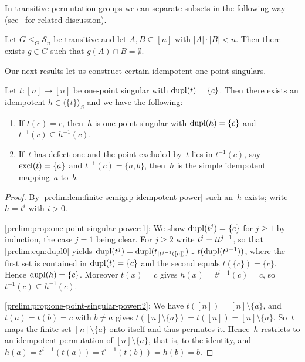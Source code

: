 In transitive permutation groups we can separate subsets in the following way
(see~\cite[p.~130]{ArCamSt2017} for related discussion).

\begin{theorem}
	\label{thm:separating_neumann}
	Let $G \le_G \mathcal S_n$ be transitive and let $A,B \subseteq [n]$ with $|A| \cdot |B| < n$.
	Then there exists $g \in G$ such that $g(A) \cap B = \emptyset$.
\end{theorem}

Our next results let us construct certain idempotent one-point singulars.

\begin{proposition} \label{prelim:prop:one-point-singular-power}
	Let $t \colon [n] \to [n]$ be one-point singular with $\dupl{t} = \{c\}$.
	Then there exists an idempotent $h \in \langle \{t\} \rangle_S$
	and we have the following:
	\begin{enumerate}
		\item \label{prelim:prop:one-point-singular-power:1} If $t(c) = c$, then~$h$ is one-point
		singular with $\dupl{h} = \{c\}$ and $t^{-1}(c) \subseteq h^{-1}(c)$.
		
		\item \label{prelim:prop:one-point-singular-power:2} If~$t$ has defect one and the point
		excluded by~$t$ lies in $t^{-1}(c)$, say $\excl{t} = \{a\}$ and $t^{-1}(c) = \{a,b\}$,
		then~$h$ is the simple idempotent mapping~$a$ to~$b$.
	\end{enumerate}
\end{proposition}
\begin{proof}
	By \cref{prelim:lem:finite-semigrp-idempotent-power} such an~$h$ exists; write $h = t^i$
	with $i > 0$.
	
	\ref{prelim:prop:one-point-singular-power:1}: We show $\dupl{t^j} = \{c\}$ for $j \ge 1$ by
	induction, the case $j = 1$ being clear.
	For $j \ge 2$ write $t^j = \concat{t^{j-1}}{t}$, so that \cref{prelim:eqn:dupl0} yields
	$\dupl{t^j} = \dupl{t_{|t^{j-1}([n])}} \cup t(\dupl{t^{j-1}})$, where the first set is
	contained in $\dupl{t} = \{c\}$ and the second equals $t(\{c\}) = \{c\}$.
	Hence $\dupl{h} = \{c\}$.
	Moreover $t(x) = c$ gives $h(x) = t^{i-1}(c) = c$, so $t^{-1}(c) \subseteq h^{-1}(c)$.
	
	\ref{prelim:prop:one-point-singular-power:2}: We have $t([n]) = [n] \setminus \{a\}$, and
	$t(a) = t(b) = c$ with $b \ne a$ gives $t([n] \setminus \{a\}) = t([n]) = [n] \setminus \{a\}$.
	So~$t$ maps the finite set $[n] \setminus \{a\}$ onto itself and thus permutes it.
	Hence~$h$ restricts to an idempotent permutation of $[n] \setminus \{a\}$, that is, to the
	identity, and $h(a) = t^{i-1}(t(a)) = t^{i-1}(t(b)) = h(b) = b$.
\end{proof}

